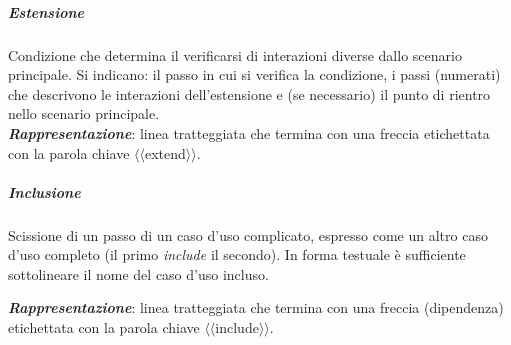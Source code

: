 \subparagraph{Estensione} Condizione che determina il verificarsi di interazioni diverse dallo scenario principale. Si indicano: il passo in cui si verifica la condizione, i passi (numerati) che descrivono le interazioni dell'estensione e (se necessario) il punto di rientro nello scenario principale.\\
\textbf{\textit{Rappresentazione}}: linea tratteggiata che termina con una freccia etichettata con la parola chiave $\langle\langle$extend$\rangle\rangle$.

\begin{figure}[H]
  \centering
  \hfill
\end{figure}

\subparagraph{Inclusione} Scissione di un passo di un caso d'uso complicato, espresso come un altro caso d'uso completo (il primo \textit{include} il secondo). In forma testuale è sufficiente sottolineare il nome del caso d'uso incluso.

\textbf{\textit{Rappresentazione}}: linea tratteggiata che termina con una freccia (dipendenza) etichettata con la parola chiave $\langle\langle$include$\rangle\rangle$.

\newpage